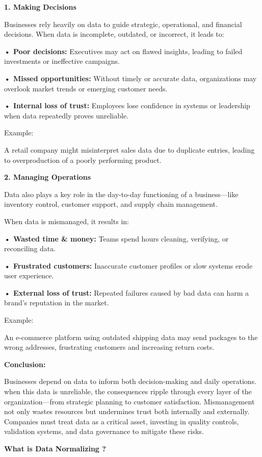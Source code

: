 \documentclass[
  man,
  floatsintext,
  longtable,
  nolmodern,
  notxfonts,
  notimes,
  colorlinks=true,linkcolor=blue,citecolor=blue,urlcolor=blue]{apa7}
\begin{document}
\textbf{1. Making Decisions}

Businesses rely heavily on data to guide strategic, operational, and
financial decisions. When data is incomplete, outdated, or incorrect, it
leads to:

\textbf{• Poor decisions:} Executives may act on flawed insights,
leading to failed investments or ineffective campaigns.

\textbf{• Missed opportunities:} Without timely or accurate data,
organizations may overlook market trends or emerging customer needs.

\textbf{• Internal loss of trust:} Employees lose confidence in systems
or leadership when data repeatedly proves unreliable.

Example:

A retail company might misinterpret sales data due to duplicate entries,
leading to overproduction of a poorly performing product.

\textbf{2. Managing Operations}

Data also plays a key role in the day-to-day functioning of a
business---like inventory control, customer support, and supply chain
management.

When data is mismanaged, it results in:

\textbf{• Wasted time \& money:} Teams spend hours cleaning, verifying,
or reconciling data.

\textbf{• Frustrated customers:} Inaccurate customer profiles or slow
systems erode user experience.

\textbf{• External loss of trust:} Repeated failures caused by bad data
can harm a brand's reputation in the market.

Example:

An e-commerce platform using outdated shipping data may send packages to
the wrong addresses, frustrating customers and increasing return costs.

\textbf{Conclusion:}

Businesses depend on data to inform both decision-making and daily
operations. when this data is unreliable, the consequences ripple
through every layer of the organization---from strategic planning to
customer satisfaction. Mismanagement not only wastes resources but
undermines trust both internally and externally. Companies must treat
data as a critical asset, investing in quality controls, validation
systems, and data governance to mitigate these risks.

\textbf{What is Data Normalizing ?}
\end{document}

